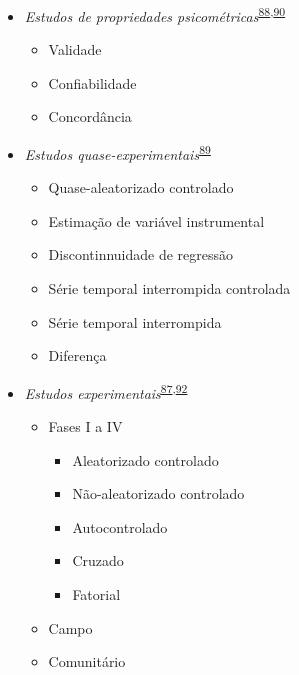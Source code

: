 \documentclass[
]{book}
\providecommand{\tightlist}{%
  \setlength{\itemsep}{0pt}\setlength{\parskip}{0pt}}
\begin{document}
\begin{itemize}
\tightlist
\item
  \emph{Estudos de propriedades psicométricas}\textsuperscript{\protect\hyperlink{ref-Souza2017}{88},\protect\hyperlink{ref-echevarruxeda-guanilo2019}{90}}

  \begin{itemize}
  \tightlist
  \item
    Validade
  \item
    Confiabilidade
  \item
    Concordância
  \end{itemize}
\end{itemize}

\begin{itemize}
\tightlist
\item
  \emph{Estudos quase-experimentais}\textsuperscript{\protect\hyperlink{ref-reeves2017}{89}}

  \begin{itemize}
  \tightlist
  \item
    Quase-aleatorizado controlado
  \item
    Estimação de variável instrumental
  \item
    Discontinnuidade de regressão
  \item
    Série temporal interrompida controlada
  \item
    Série temporal interrompida
  \item
    Diferença
  \end{itemize}
\end{itemize}

\begin{itemize}
\tightlist
\item
  \emph{Estudos experimentais}\textsuperscript{\protect\hyperlink{ref-Suxfct2014}{87},\protect\hyperlink{ref-Chidambaram2019}{92}}

  \begin{itemize}
  \tightlist
  \item
    Fases I a IV

    \begin{itemize}
    \tightlist
    \item
      Aleatorizado controlado
    \item
      Não-aleatorizado controlado
    \item
      Autocontrolado
    \item
      Cruzado
    \item
      Fatorial
    \end{itemize}
  \item
    Campo
  \item
    Comunitário
  \end{itemize}
\end{itemize}
\end{document}
